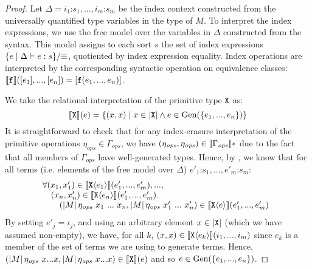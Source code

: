 \begin{proof}
  Let $\Delta = i_1\mathord:s_1,...,i_m\mathord:s_m$ be the index
  context constructed from the universally quantified type variables
  in the type of $M$.  To interpret the index expressions, we use the
  free model over the variables in $\Delta$ constructed from the
  syntax. This model assigns to each sort $s$ the set of index
  expressions $\{ e \mathrel| \Delta \vdash e : s \}/\mathord\equiv$,
  quotiented by index expression equality. Index operations are
  interpreted by the corresponding syntactic operation on equivalence
  classes: $\llbracket \texttt{\textup{f}} \rrbracket([e_1],...,[e_n]) =
  [\texttt{\textup{f}}(e_1,...,e_n)]$.

  We take the relational interpretation of the primitive type
  $\textup{\texttt{X}}$ as:
  \begin{displaymath}
    \llbracket \textup{\texttt{X}} \rrbracket(e) = \{ (x,x) \mathrel| x \in \left| \textup{\texttt{X}}\right| \land e \in \mathrm{Gen}(\{e_1,...,e_n\}) \}
  \end{displaymath}
  It is straightforward to check that for any index-erasure
  interpretation of the primitive operations $\eta_{\mathit{ops}} \in
  \Gamma_{\mathit{ops}}$, we have $(\eta_{\mathit{ops}},
  \eta_{\mathit{ops}}) \in \llbracket \Gamma_{\mathit{ops}} \rrbracket*$ due to the
  fact that all members of $\Gamma_{\mathit{ops}}$ have well-generated
  types. Hence, by , we know that for all
  terms (i.e. elements of the free model over $\Delta$)
  $e'_1\mathord:s_1,...,e'_m\mathord:s_m$:
  \begin{displaymath}%
    \begin{array}{@{}l}
      \forall (x_1,x_1') \in \rsem{\tyPrim{X}{e_1}}(e'_1,...,e'_m), ..., \\
      \quad(x_n, x'_n) \in \rsem{\tyPrim{X}{e_n}}(e'_1,...,e'_m). \\
      \quad\quad (\tmSem{M} \eta_{\mathit{ops}}~x_1 ~...~x_n, \tmSem{M}\eta_{\mathit{ops}}~x'_1~...~x'_n) \in \rsem{\tyPrim{X}{e}}(e'_1,...,e'_m)
    \end{array}
  \end{displaymath}
  By setting $e'_j = i_j$, and using an arbitrary element $x \in
  \left| \textup{\texttt{X}}\right|$ (which we have assumed non-empty), we have,
  for all $k$, $(x,x) \in \llbracket \textup{\texttt{X}}\langle e_k \rangle \rrbracket(i_1,...,i_m)$ since
  $e_k$ is a member of the set of terms we are using to generate
  terms. Hence, $(\left| M\right| \eta_{\mathit{ops}}~x...x,
  \left| M\right|\eta_{\mathit{ops}}~x...x) \in \llbracket \textup{\texttt{X}} \rrbracket(e)$ and
  so $e \in \mathrm{Gen}(\{e_1,...,e_n\})$.
\end{proof}

